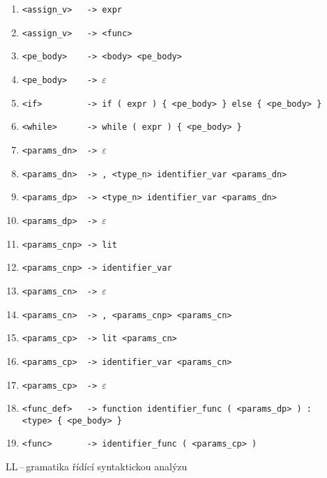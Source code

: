 \documentclass[a4paper,12pt]{article}
\begin{document}
\begin{table}[!ht]
\begin{enumerate}[noitemsep]
		\item \verb|<assign_v>   -> expr|
		\item \verb|<assign_v>   -> <func>|
		      		      		      		      		      		      		              
		\item \verb|<pe_body>    -> <body> <pe_body>|
		\item \verb|<pe_body>    -> |$\varepsilon$
		      		      		      		      		      		      		      		      		      	    
		\item \verb|<if>         -> if ( expr ) { <pe_body> } else { <pe_body> }|
		\item \verb|<while>      -> while ( expr ) { <pe_body> }|
		      		      		      		      		      		      		      		      		    	    
		\item \verb|<params_dn>  -> |$\varepsilon$
		\item \verb|<params_dn>  -> , <type_n> identifier_var <params_dn>|
		      		      		      		      		      		      		              
		\item \verb|<params_dp>  -> <type_n> identifier_var <params_dn>|
		\item \verb|<params_dp>  -> |$\varepsilon$
		      		      		      		      		      
		\item \verb|<params_cnp> -> lit|
		\item \verb|<params_cnp> -> identifier_var|
		      		      		      		      		      		      		              
		\item \verb|<params_cn>  -> |$\varepsilon$
		\item \verb|<params_cn>  -> , <params_cnp> <params_cn>|
		      		      		         		      		              
		\item \verb|<params_cp>  -> lit <params_cn>|
		\item \verb|<params_cp>  -> identifier_var <params_cn>|
		\item \verb|<params_cp>  -> |$\varepsilon$
		      		      		      		      		      		      		      		      		      	    
		\item \verb|<func_def>   -> function identifier_func ( <params_dp> ) :| 
		      \newline \verb |               <type> { <pe_body> }|
		\item \verb|<func>       -> identifier_func ( <params_cp> )|
		      		      		      		      		      		      		      		      		      	    
	\end{enumerate}
	\caption{LL\,--\,gramatika řídící syntaktickou analýzu}
	\label{table:ll-gramatika}
\end{table}
\clearpage
\end{document}
